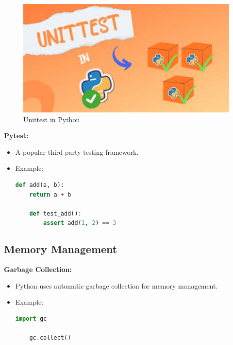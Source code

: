 \documentclass[12pt]{article}
\begin{document}
\begin{figure}[h!]
\begin{center}
\includegraphics[width=12.5cm]{advanced6.jpg}\\
Unittest in Python
\end{center}
\end{figure}

\textbf{Pytest:}
\begin{itemize}
    \item A popular third-party testing framework.

    \item Example:\\
    \begin{lstlisting}[language = Python]
    def add(a, b):
    return a + b

    def test_add():
        assert add(1, 2) == 3
    \end{lstlisting}
    
\end{itemize}

\subsection{Memory Management}

\textbf{Garbage Collection:}
\begin{itemize}
    \item Python uses automatic garbage collection for memory management.

    \item Example:\\
    \begin{lstlisting}[language = Python]
    import gc

    gc.collect()
    \end{lstlisting}
    
\end{itemize}
\end{document}

